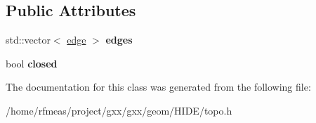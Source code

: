 \subsection*{Public Attributes}
\begin{DoxyCompactItemize}
\item 
std\+::vector$<$ \hyperlink{classgxx_1_1topo_1_1edge}{edge} $>$ {\bfseries edges}\hypertarget{classgxx_1_1topo_1_1wire__impl_ac70dd8965bbc750a17cfd39fc000cabc}{}\label{classgxx_1_1topo_1_1wire__impl_ac70dd8965bbc750a17cfd39fc000cabc}

\item 
bool {\bfseries closed}\hypertarget{classgxx_1_1topo_1_1wire__impl_a2721681a5921392fef7f6534e83d8a52}{}\label{classgxx_1_1topo_1_1wire__impl_a2721681a5921392fef7f6534e83d8a52}

\end{DoxyCompactItemize}


The documentation for this class was generated from the following file\+:\begin{DoxyCompactItemize}
\item 
/home/rfmeas/project/gxx/gxx/geom/\+H\+I\+D\+E/topo.\+h\end{DoxyCompactItemize}
